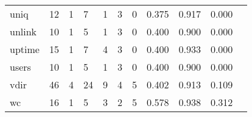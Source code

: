 \begin{longtable}{lp{1.20cm}p{1.20cm}p{1.20cm}p{1.20cm}p{1.20cm}p{1.20cm}p{1.20cm}p{1.20cm}p{1.20cm}p{1.20cm}}
uniq      &                                    12 &                                                  1 &                                                  7 &                                                  1 &                                                  3 &                                                  0 &                                         0.375 &                                              0.917 &                                              0.000 \\
unlink    &                                    10 &                                                  1 &                                                  5 &                                                  1 &                                                  3 &                                                  0 &                                         0.400 &                                              0.900 &                                              0.000 \\
uptime    &                                    15 &                                                  1 &                                                  7 &                                                  4 &                                                  3 &                                                  0 &                                         0.400 &                                              0.933 &                                              0.000 \\
users     &                                    10 &                                                  1 &                                                  5 &                                                  1 &                                                  3 &                                                  0 &                                         0.400 &                                              0.900 &                                              0.000 \\
vdir      &                                    46 &                                                  4 &                                                 24 &                                                  9 &                                                  4 &                                                  5 &                                         0.402 &                                              0.913 &                                              0.109 \\
wc        &                                    16 &                                                  1 &                                                  5 &                                                  3 &                                                  2 &                                                  5 &                                         0.578 &                                              0.938 &                                              0.312 \\

\end{longtable}
